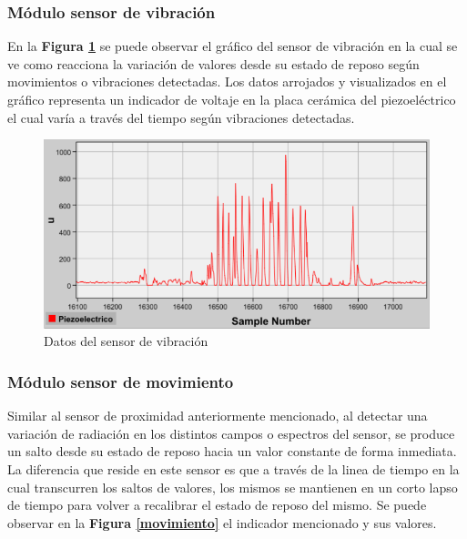 \documentclass{IEEEtran}
\begin{document}
			\subsubsection{Módulo sensor de vibración}

				En la \textbf{Figura \ref{piezo}} se puede observar el gráfico del sensor de vibración en la cual se ve como reacciona la variación de valores desde su estado de reposo según movimientos o vibraciones detectadas. Los datos arrojados y visualizados en el gráfico representa un indicador de voltaje en la placa cerámica del piezoeléctrico el cual varía a través del tiempo según vibraciones detectadas. 

				\begin{figure}
					\centering
					\includegraphics[width=1\linewidth]{piezo}
					\caption{Datos del sensor de vibración}
					\label{piezo}
				\end{figure}

			\subsubsection{Módulo sensor de movimiento}
				
				Similar al sensor de proximidad anteriormente mencionado, al detectar una variación de radiación en los distintos campos o espectros del sensor, se produce un salto desde su estado de reposo hacia un valor constante de forma inmediata. La diferencia que reside en este sensor es que a través de la linea de tiempo en la cual transcurren los saltos de valores, los mismos se mantienen en un corto lapso de tiempo para volver a recalibrar el estado de reposo del mismo. Se puede observar en la \textbf{Figura \ref{movimiento}} el indicador mencionado y sus valores.
\end{document}

